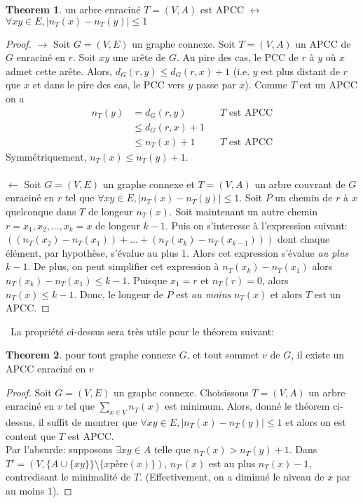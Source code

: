 \documentclass[french]{article}
\theoremstyle{definition}
\newtheorem{theorem}{Theorem}[section]
\begin{document}
		\begin{theorem}{un arbre enraciné $T = (V, A)$ est APCC $\leftrightarrow$ $\forall xy \in E, |n_T(x) - n_T(y)| \leq 1$}
			\begin{proof}
				$\rightarrow$ Soit $G = (V, E)$ un graphe connexe. Soit $T = (V, A)$ un APCC de $G$ enraciné en $r$. Soit $xy$ une arête de $G$. Au pire des cas, le PCC de $r$ à $y$ où $x$ admet cette arête. Alors, $d_G(r, y) \leq d_G(r, x) + 1$ (i.e. $y$ est plus distant de $r$ que $x$ et dans le pire des cas, le PCC vers $y$ passe par $x$). Comme $T$ est un APCC on a
				\begin{align*}
					n_T(y) & = d_G(r, y) && T \text{ est APCC} \\
					& \leq d_G(r, x) + 1 \\
					& \leq n_T(x) + 1 && T \text{ est APCC}
				\end{align*}
				Symmétriquement, $n_T(x) \leq n_T(y) + 1$.
				\\
				\\
				$\leftarrow$ Soit $G = (V, E)$ un graphe connexe et $T = (V, A)$ un arbre couvrant de $G$ enraciné en $r$ tel que $\forall xy \in E, |n_T(x) - n_T(y)| \leq 1$. Soit $P$ un chemin de $r$ à $x$ quelconque dans $T$ de longeur $n_T(x)$. Soit maintenant un autre chemin $r = x_1, x_2, \dots , x_k = x$ de longeur $k - 1$. Puis on s'interesse à l'expression suivant: $( (n_T(x_2) - n_T(x_1)) + \dots + (n_T(x_k) - n_T(x_{k - 1})))$ dont chaque élément, par hypothèse, s'évalue au plus $1$. Alors cet expression s'évalue \textit{au plus} $k - 1$. De plus, on peut simplifier cet expression à $n_T(x_k) - n_T(x_1)$ alors $n_T(x_k) - n_T(x_1) \leq k - 1$. Puisque $x_1 = r$ et $n_T(r) = 0$, alors $n_T(x) \leq k - 1$. Donc, le longeur de $P$ est \textit{au moins} $n_T(x)$ et alors $T$ est un APCC.
			\end{proof}
		\end{theorem}
		\
		La propriété ci-dessus sera très utile pour le théorem suivant:\\
		\begin{theorem}{pour tout graphe connexe $G$, et tout sommet $v$ de $G$, il existe un APCC enraciné en $v$}
			\begin{proof}
				Soit $G = (V, E)$ un graphe connexe. Choisissons $T = (V, A)$ un arbre enraciné en $v$ tel que $\sum_{x \in V}n_T(x)$ est minimum. Alors, donné le théorem ci-dessus, il suffit de montrer que $\forall xy \in E, | n_T(x) - n_T(y) | \leq 1$ et alors on est content que $T$ est APCC.\\
				Par l'absurde: supposons $\exists xy \in A$ telle que $n_T(x) > n_T(y) + 1$. Dans $T' = (V, \{A \cup \{xy\}\} \setminus \{x\text{père}(x)\})$, $n_{T'}(x)$ est au plus $n_T(x) - 1$, contredisant le minimalité de $T$. (Effectivement, on a diminué le niveau de $x$ par au moins $1$). 
			\end{proof}

		\end{theorem}
		
\end{document}
